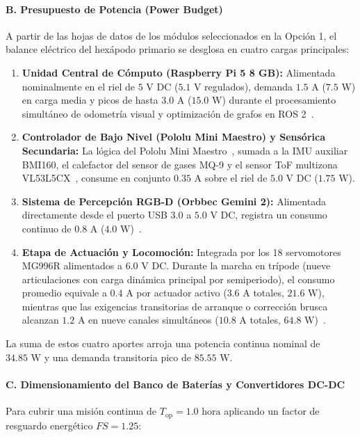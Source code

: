 \paragraph{B. Presupuesto de Potencia (Power Budget)}
A partir de las hojas de datos de los módulos seleccionados en la Opción 1, el balance eléctrico del hexápodo primario se desglosa en cuatro cargas principales:

\begin{enumerate}
    \item \textbf{Unidad Central de Cómputo (Raspberry Pi 5 8 GB):} Alimentada nominalmente en el riel de $5\text{ V DC}$ ($5.1\text{ V}$ regulados), demanda $1.5\text{ A}$ ($7.5\text{ W}$) en carga media y picos de hasta $3.0\text{ A}$ ($15.0\text{ W}$) durante el procesamiento simultáneo de odometría visual y optimización de grafos en ROS 2~\cite{RaspberryPi5_Datasheet}.
    \item \textbf{Controlador de Bajo Nivel (Pololu Mini Maestro) y Sensórica Secundaria:} La lógica del Pololu Mini Maestro~\cite{Pololu_Maestro_Datasheet}, sumada a la IMU auxiliar BMI160, el calefactor del sensor de gases MQ-9 y el sensor ToF multizona VL53L5CX~\cite{MQ9_Datasheet, VL53L5CX_Datasheet}, consume en conjunto $0.35\text{ A}$ sobre el riel de $5.0\text{ V DC}$ ($1.75\text{ W}$).
    \item \textbf{Sistema de Percepción RGB-D (Orbbec Gemini 2):} Alimentada directamente desde el puerto USB 3.0 a $5.0\text{ V DC}$, registra un consumo continuo de $0.8\text{ A}$ ($4.0\text{ W}$)~\cite{Orbbec_Gemini2_Datasheet}.
    \item \textbf{Etapa de Actuación y Locomoción:} Integrada por los 18 servomotores MG996R alimentados a $6.0\text{ V DC}$. Durante la marcha en trípode (nueve articulaciones con carga dinámica principal por semiperiodo), el consumo promedio equivale a $0.4\text{ A}$ por actuador activo ($3.6\text{ A}$ totales, $21.6\text{ W}$), mientras que las exigencias transitorias de arranque o corrección brusca alcanzan $1.2\text{ A}$ en nueve canales simultáneos ($10.8\text{ A}$ totales, $64.8\text{ W}$)~\cite{MG996R_Datasheet}.
\end{enumerate}

La suma de estos cuatro aportes arroja una potencia continua nominal de $34.85\text{ W}$ y una demanda transitoria pico de $85.55\text{ W}$.

\paragraph{C. Dimensionamiento del Banco de Baterías y Convertidores DC-DC}
Para cubrir una misión continua de $T_{\text{op}} = 1.0\text{ hora}$ aplicando un factor de resguardo energético $FS = 1.25$:

